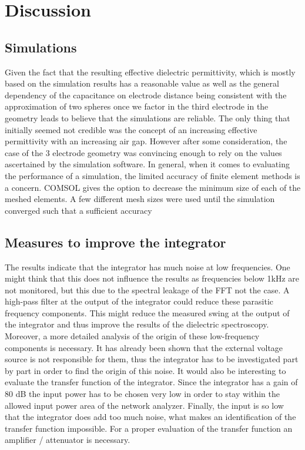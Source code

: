 \chapter{Discussion}

\section{Simulations}
Given the fact that the resulting effective dielectric permittivity, which
is mostly based on the simulation results has 
a reasonable value as well as the general dependency of the capacitance on electrode distance being consistent
with the approximation of two spheres once we factor in the third electrode in the geometry leads
to believe that the simulations are reliable. 
\newline
The only thing that initially seemed not credible was the concept of an increasing effective permittivity
with an increasing air gap. However after some consideration, the case of the 3 electrode geometry was convincing enough to rely
on the values ascertained by the simulation software. 
\newline
In general, when it comes to evaluating the performance of a simulation, the limited accuracy
of finite element methods is a concern. COMSOL gives the option to decrease the minimum size of each of the meshed elements.
A few different mesh sizes were used until the simulation converged such that a sufficient accuracy
\section{Measures to improve the integrator}
The results indicate that the integrator has much noise at low frequencies. One might think that this does not influence the results as frequencies below 1kHz are not monitored, but this due to the spectral leakage of the FFT not the case.  A high-pass filter at the output of the integrator could reduce these parasitic frequency components. This might reduce the measured swing at the output of the integrator and thus improve the results of the dielectric spectroscopy. 
Moreover, a more detailed analysis of the origin of these low-frequency components is necessary. It has already been shown that the external voltage source is not responsible for them, thus the integrator has to be investigated part by part in order to find the origin of this noise. 
It would also be interesting to evaluate the transfer function of the integrator. Since the integrator has a gain of 80 dB the input power has to be chosen very low in order to stay within the allowed input power area of the network analyzer. Finally, the input is so low that the integrator does add too much noise, what makes an identification of the transfer function impossible. For a proper evaluation of the transfer function an amplifier / attenuator is necessary. 

